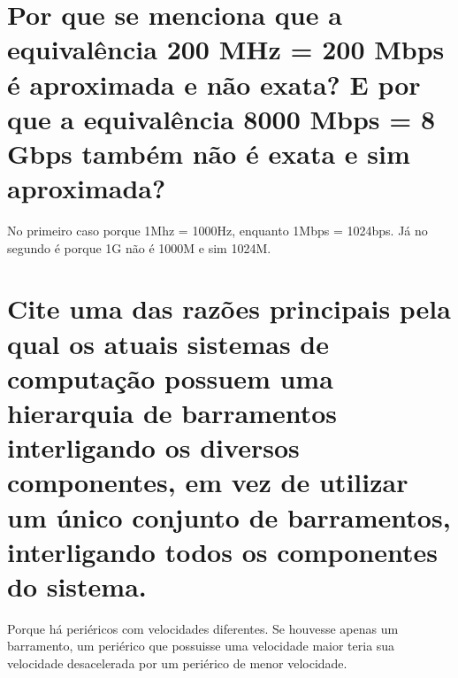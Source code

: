 \documentclass[11pt]{article}
\begin{document}
\section{Por que se menciona que a equivalência 200 MHz = 200 Mbps é aproximada e não exata? E por que a equivalência 8000 Mbps = 8 Gbps também não é exata e sim aproximada?}
\label{sec:org60ec1c2}
No primeiro caso porque 1Mhz = 1000Hz, enquanto 1Mbps = 1024bps. Já no segundo é
porque 1G não é 1000M e sim 1024M.
\section{Cite uma das razões principais pela qual os atuais sistemas de computação possuem uma hierarquia de barramentos interligando os diversos componentes, em vez de utilizar um único conjunto de barramentos, interligando todos os componentes do sistema.}
\label{sec:org46c6a41}
Porque há periéricos com velocidades diferentes. Se houvesse apenas um
barramento, um periérico que possuisse uma velocidade maior teria sua velocidade
desacelerada por um periérico de menor velocidade.
\end{document}
